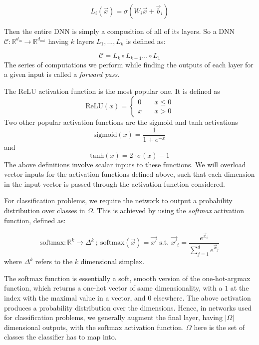 \documentclass{ociamthesis}
\begin{document}
\begin{equation*}
    L_i(\vec{x})
    = \sigma(W_i\vec{x} + \vec{b}_i)
\end{equation*}

Then the entire DNN is simply a composition of all of its layers. So a DNN
$\mathcal{C}: \mathbb{R}^{d_\text{in}} \to \mathbb{R}^{d_\text{out}}$ having $k$
layers $L_1,...,L_k$ is defined as:

\begin{equation*}
    \mathcal{C} = L_k \circ L_{k-1} ... \circ L_1
\end{equation*}
The series of computations we perform while finding the outputs of each layer
for a given input is called a \emph{forward pass}.

The ReLU activation function is the most popular one. It is defined as
\begin{equation*}
    \text{ReLU}(x) = 
    \left\{
        \begin{array}{ll}
            0 & \quad x \leq 0 \\
            x & \quad x > 0
        \end{array}
    \right.
\end{equation*}
Two other popular activation functions are the sigmoid and tanh activations
\begin{equation*}
    \text{sigmoid}(x)=\frac{1}{1+e^{-x}}
\end{equation*} and
\begin{equation*}
    \text{tanh}(x) = 2\cdot\sigma(x) - 1
\end{equation*}
The above definitions involve scalar inputs to these functions. We will overload
vector inputs for the activation functions defined above, such that each
dimension in the input vector is passed through the activation function
considered.

For classification problems, we require the network to output a probability
distribution over classes in $\Omega$. This is achieved by using the
\emph{softmax} activation function, defined as:

\begin{equation*}
    \text{softmax}: \mathbb{R}^k \to \Delta^k~;~
    \text{softmax}(\vec{x}) = \vec{x'} \text{ s.t. } 
    \vec{x'}_i = \frac{e^{\vec{x}_i}}{\sum_{j=1}^{d}e^{\vec{x}_j}}
\end{equation*}
where $\Delta^k$ refers to the $k$ dimensional simplex.

The softmax function is essentially a soft, smooth version of the one-hot-argmax
function, which returns a one-hot vector of same dimensionality, with a $1$ at
the index with the maximal value in a vector, and 0 elsewhere. The above
activation produces a probability distribution over the dimensions. Hence, in
networks used for classification problems, we generally augment the final layer,
having $|\Omega|$ dimensional outputs, with the softmax activation function.
$\Omega$ here is the set of classes the classifier has to map into.
\end{document}
